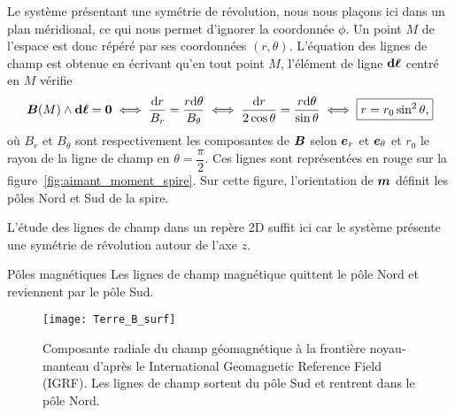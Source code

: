 	Le système présentant
	une symétrie de révolution, nous nous plaçons ici dans un plan méridional,
	ce qui nous permet d'ignorer la coordonnée $\phi$. Un point
	$M$ de l'espace est donc répéré par ses coordonnées $(r, \theta)$. L'équation des
	lignes de champ est obtenue en écrivant qu'en tout point $M$, l'élément 
	de ligne $\dl$ centré en $M$ vérifie
	\begin{equation*}
		\vecb(M) \wedge \dl = \mitbf{0} \iff \dfrac{\dr}{B_r} = 
		\dfrac{r\dtheta}{B_\theta} \iff \dfrac{\dr}{2\cos\theta} =
		\dfrac{r \dtheta}{\sin \theta} \iff \boxed{r = r_0 \sin^2 \theta,}
	\end{equation*}
	où $B_r$ et $B_\theta$ sont respectivement les composantes de $\vecb$ selon
	$\er$ et $\etheta$ et $r_0$ le rayon de la ligne de champ en $\theta = 
	\dfrac{\pi}{2}$. Ces lignes sont représentées en rouge sur la 
	figure~\ref{fig:aimant_moment_spire}. Sur cette figure, l'orientation
	de $\vecm$ définit les pôles Nord et Sud de la spire.
	
	\begin{rema}
	L'étude des lignes
	de champ dans un repère 2D suffit ici car le système présente une symétrie de
	révolution autour de l'axe $z$. 
	\end{rema}

	\begin{defn}{Pôles magnétiques}
		Les lignes de champ magnétique quittent le pôle Nord et 
		reviennent par le pôle Sud.
	\end{defn}
	
	\begin{figure}[b]
		\centering
		\texttt{[image: Terre\_B\_surf]}
		\caption{Composante radiale du champ géomagnétique à la frontière
		noyau-manteau d'après le International Geomagnetic Reference Field
		(IGRF). Les lignes de champ sortent du pôle Sud et rentrent
		dans le pôle Nord.}%
		\label{fig:Terre_surf}
	\end{figure}

